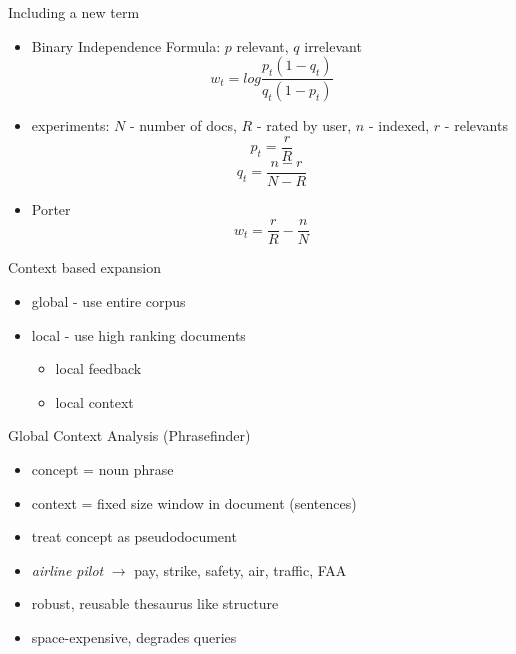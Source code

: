 \begin{frame}{Including a new term}
  \begin{itemize}
    \item Binary Independence Formula: $p$ relevant, $q$ irrelevant
    \begin{equation}
    w_t = log \frac{p_t(1-q_t)}{q_t(1-p_t)}
    \end{equation}
    \item experiments: $N$ - number of docs, $R$ - rated by user, $n$ -
    indexed, $r$ - relevants
    \begin{equation}
    p_t = \frac{r}{R}
    \end{equation}
    \begin{equation}
    q_t = \frac{n - r}{N - R}
    \end{equation}
    \item Porter
    \begin{equation}
    w_t = \frac{r}{R} - \frac{n}{N}
    \end{equation}
  \end{itemize}
\end{frame}

\begin{frame}{Context based expansion}
  \begin{itemize}
    \item global - use entire corpus
    \item local - use high ranking documents
      \begin{itemize}
        \item local feedback
        \item local context
      \end{itemize}
  \end{itemize}
\end{frame}

\begin{frame}{Global Context Analysis (Phrasefinder)}
  \begin{itemize}
    \item concept = noun phrase
    \item context = fixed size window in document (sentences)
    \item treat concept as pseudodocument
    \item \textit{airline pilot} $\rightarrow$ pay, strike, safety, air, traffic, FAA
    \item robust, reusable thesaurus like structure
    \item space-expensive, degrades queries
  \end{itemize}
\end{frame}

